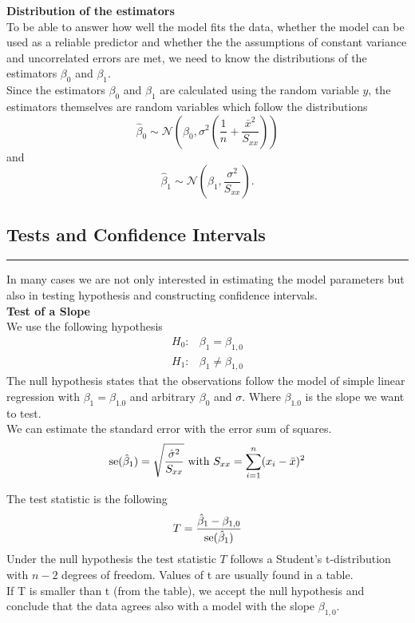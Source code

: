 \textbf{Distribution of the estimators}\\
To be able to answer how well the model fits the data, whether the model can be used as a reliable predictor and whether the the assumptions of constant variance and uncorrelated errors are met, we need to know the distributions of the estimators $\beta_0$ and $\beta_1$.\\
Since the estimators $\beta_0$ and $\beta_1$ are calculated using the random variable $y$, the estimators themselves are random variables which follow the distributions
\begin{equation}
  \hat{\beta}_0 \sim \mathcal{N}\left(\beta_0, \sigma^2\left(\frac{1}{n} + \frac{\bar{x}^2}{S_{xx}}\right)\right)
\end{equation}
and
\begin{equation}
  \hat{\beta}_1 \sim \mathcal{N}\left(\beta_1, \frac{\sigma^2}{S_{xx}}\right).
\end{equation}

\subsection{Tests and Confidence Intervals}
\noindent\rule[\linienAbstand]{\linewidth}{\linienDicke}
In many cases we are not only interested in estimating the model parameters but also in testing hypothesis and constructing confidence intervals.\\

\textbf{Test of a Slope}\\
We use the following hypothesis
\begin{equation}
  \begin{split}
    H_0:& \beta_1 = \beta_{1,0}\\
    H_1:& \beta_1 \neq \beta_{1,0}
  \end{split}
\end{equation}
The null hypothesis states that the observations follow the model of simple linear regression with $\beta_{1} = \beta_{1.0}$ and arbitrary $\beta_0$ and $\sigma$. Where $\beta_{1.0}$ is the slope we want to test.\\

We can estimate the standard error with the error sum of squares.
\begin{equation}
  \textup{se}(\hat{\beta}_1) = \sqrt{\frac{\hat{\sigma}^2}{S_{xx}}} \text{    with    } S_{xx} =  \sum^n_{i=1}(x_i - \bar{x})^2
\end{equation}

The test statistic is the following
\begin{equation}
  T = \frac{\hat{\beta}_1 - \beta_{1,0}}{\textup{se}(\hat{\beta}_1)}
  \label{eq:7.3.b}
\end{equation}
Under the null hypothesis the test statistic $T$ follows a Student’s t-distribution with $n - 2$ degrees of freedom. Values of t are usually found in a table.\\
If T is smaller than t (from the table), we accept the null hypothesis and conclude that the data agrees also with a model with the slope $\beta_{1,0}$.\\


